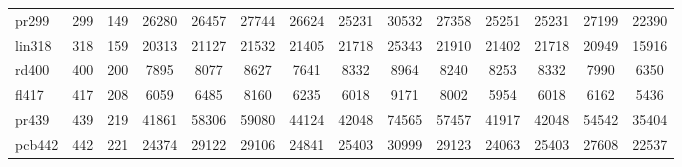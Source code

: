 \documentclass[conference]{IEEEtran}
\begin{document}
\begin{table}[htbp]
{{\begin{tabular}{|l|c|c|c|c|c|c|c|c|c|c|c|c|c|}
pr299 & 299 & 149 & 26280 & 26457 & 27744 & 26624 & 25231 & 30532 & 27358 & 25251 & 25231 & 27199 & 22390 \\
lin318 & 318 & 159 & 20313 & 21127 & 21532 & 21405 & 21718 & 25343 & 21910 & 21402 & 21718 & 20949 & 15916 \\
rd400 & 400 & 200 & 7895 & 8077 & 8627 & 7641 & 8332 & 8964 & 8240 & 8253 & 8332 & 7990 & 6350 \\
fl417 & 417 & 208 & 6059 & 6485 & 8160 & 6235 & 6018 & 9171 & 8002 & 5954 & 6018 & 6162 & 5436 \\
pr439 & 439 & 219 & 41861 & 58306 & 59080 & 44124 & 42048 & 74565 & 57457 & 41917 & 42048 & 54542 & 35404 \\
pcb442 & 442 & 221 & 24374 & 29122 & 29106 & 24841 & 25403 & 30999 & 29123 & 24063 & 25403 & 27608 & 22537 \\
\hline
\end{tabular}}}
\end{table}
\end{document}

